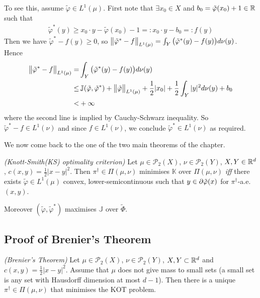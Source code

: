 \documentclass[10pt,a4paper]{article}
\renewenvironment{i}
{\begin{itemize} 
	}%
	{\end{itemize}
}
\begin{document}
\begin{i}
To see this, assume $\tilde{\varphi}\in L^1(\mu)$. First note that $\exists x_0 \in X$ and $b_0 = \tilde{\varphi}(x_0) +1 \in \mathbb{R}$ such that
\begin{align*}
\tilde{\varphi}^*(y) \geq x_0 \cdot y - \tilde{\varphi}(x_0) -1 =: x_0 \cdot y - b_0 =: f(y)
\end{align*} 
Then we have $\tilde{\varphi}^* - f(y) \geq 0$, so $\bigl\lVert\tilde{\varphi}^* - f\bigr\rVert_{L^1(\mu)} = \int_Y \big( \tilde{\varphi}^*(y) - f(y) \big) d\nu(y)$. Hence
\begin{align*}
\bigl\lVert\tilde{\varphi}^* - f\bigr\rVert_{L^1(\mu)} =& \int_Y \big( \tilde{\varphi}^*(y) - f(y) \big) d\nu(y) \\
\leq & \, \mathbb{J} (\tilde{\varphi}, \tilde{\varphi}^*) + \bigl\lVert\tilde{\varphi}\bigr\rVert_{L^1(\mu)} + \frac{1}{2} |x_0| + \frac{1}{2} \int_Y |y|^2 d\nu(y) + b_0 \\
<&  +\infty
\end{align*}
where the second line is implied by Cauchy-Schwarz inequality. So $\tilde{\varphi}^* - f\in L^1(\nu)$ and since $f\in L^1(\nu)$, we conclude $\tilde{\varphi}^* \in L^1(\nu)$ as required.

\end{i}
\s

We now come back to the one of the two main theorems of the chapter.
\s

 \emph{(Knott-Smith(KS) optimality criterion)} Let $\mu \in \mathscr{P}_2(X)$, $\nu \in \mathscr{P}_2(Y)$, $X, Y\in \mathbb{R}^d$, $c(x,y) = \frac{1}{2} |x-y|^2$. Then $\pi^{\dagger} \in \Pi(\mu, \nu)$ minimises $\mathbb{K}$ over $\Pi(\mu, \nu)$ \emph{iff} there exists $\tilde{\varphi} \in L^1(\mu)$ convex, lower-semicontinuous such that $y\in \partial \tilde{\varphi}(x)$ for $\pi^{\dagger}$-a.e. $(x,y)$.

\quad Moreover $(\tilde{\varphi}, \tilde{\varphi}^*)$ maximises $\mathbb{J}$ over $\tilde{\Phi}$.

\subsection{Proof of Brenier's Theorem}

 \emph{(Brenier's Theorem)} Let $\mu \in \mathscr{P}_2(X)$, $\nu \in \mathscr{P}_2(Y)$, $X, Y\subset \mathbb{R}^d$ and $c(x,y) = \frac{1}{2} |x-y|^2$. Assume that $\mu$ does not give mass to small sets (a small set is any set with Hausdorff dimension at most $d-1$). Then there is a unique $\pi^{\dagger} \in \Pi(\mu, \nu)$ that minimises the KOT problem.
\end{document}
